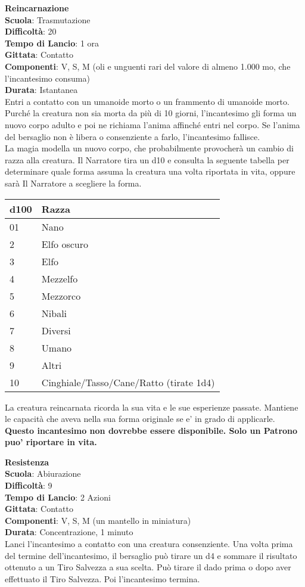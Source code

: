 \begin{multicols}{2}
\medskip\textbf{Reincarnazione}\\
\textbf{Scuola}: Trasmutazione\\
\textbf{Difficoltà}:  20\\
\textbf{Tempo di Lancio}: 1 ora\\
\textbf{Gittata}: Contatto\\
\textbf{Componenti}: V, S, M (oli e unguenti rari del valore di almeno 1.000 mo, che l'incantesimo consuma)\\
\textbf{Durata}: Istantanea\\
Entri a contatto con un umanoide morto o un frammento di umanoide morto. Purché la creatura non sia morta da più di 10 giorni, l'incantesimo gli forma un nuovo corpo adulto e poi ne richiama l’anima affinché entri nel corpo. Se l’anima del bersaglio non è libera o consenziente a farlo, l'incantesimo fallisce.\\
La magia modella un nuovo corpo, che probabilmente provocherà un cambio di razza alla creatura. Il Narratore tira un d10 e consulta la seguente tabella per determinare quale forma assuma la creatura una volta riportata in vita, oppure sarà Il Narratore a scegliere la forma.\\
\medskip
\begin{tabular}{ll}
\textbf{d100} &\textbf{Razza}\\
\toprule
01&Nano\\
2&Elfo oscuro\\
3&Elfo\\
4&Mezzelfo\\
5&Mezzorco\\
6&Nibali\\
7&Diversi\\
8&Umano\\
9&Altri\\
10&Cinghiale/Tasso/Cane/Ratto (tirate 1d4)\\
\end{tabular}

La creatura reincarnata ricorda la sua vita e le sue esperienze passate. Mantiene le capacità che aveva nella sua forma originale se e' in grado di applicarle.\\
\textbf{Questo incantesimo non dovrebbe essere disponibile. Solo un Patrono puo' riportare in vita.}

\medskip\textbf{Resistenza}\\
\textbf{Scuola}: Abiurazione\\
\textbf{Difficoltà}:  9\\
\textbf{Tempo di Lancio}: 2 Azioni\\
\textbf{Gittata}: Contatto\\
\textbf{Componenti}: V, S, M (un mantello in miniatura)\\
\textbf{Durata}: Concentrazione, 1 minuto\\
Lanci l'incantesimo a contatto con una creatura consenziente. Una volta prima del termine dell'incantesimo, il bersaglio può tirare un d4 e sommare il risultato ottenuto a un Tiro Salvezza a  sua scelta. Può tirare il dado prima o dopo aver effettuato il Tiro Salvezza. Poi l'incantesimo termina.


\end{multicols}
